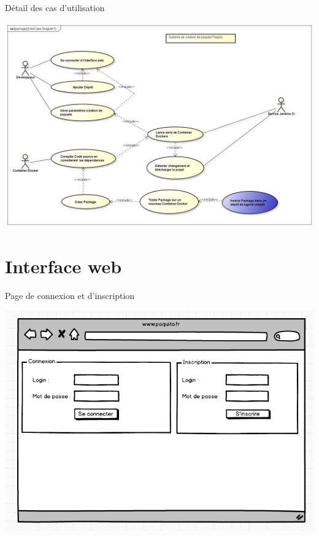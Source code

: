 \documentclass[11pt,xcolor=dvipsnames]{beamer}
\begin{document}
\begin{frame}{Détail des cas d'utilisation}
	\begin{center}	
		\includegraphics[scale=\largeur]{../img/Diagram10.jpg}
	\end{center}
\end{frame}

\renewcommand\largeur{0.485}

\section{Interface web}
\begin{frame}{Page de connexion et d'inscription}
	\begin{center}
		\includegraphics[scale=\largeur]{../img/maquette_1.png}
	\end{center}
\end{frame}
\end{document}
